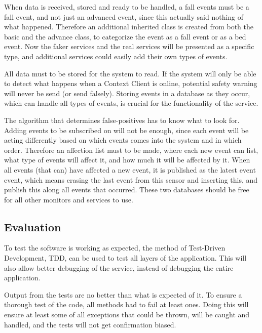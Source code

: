 When data is received, stored and ready to be handled, a fall events must be a fall event, and not just an advanced event, since this actually said nothing of what happened.
Therefore an additional inherited class is created from both the basic and the advance class, to categorize the event as a fall event or as a bed event.
Now the faker services and the real services will be presented as a specific type, and additional services could easily add their own types of events.

All data must to be stored for the system to read.
If the system will only be able to detect what happens when a Context Client\cite{JCAF} is online, potential safety warning will never be send (or send falsely).
Storing events in a database as they occur, which can handle all types of events, is crucial for the functionality of the service.

The algorithm that determines false-positives has to know what to look for.
Adding events to be subscribed on will not be enough, since each event will be acting differently based on which events comes into the system and in which order.
Therefore an affection list must to be made, where each new event can list, what type of events will affect it, and how much it will be affected by it.
When all events (that can) have affected a new event, it is published as the latest event event, which means erasing the last event from this sensor and inserting this, and publish this along all events that occurred.
These two databases should be free for all other monitors and services to use.

\vspace{-10pt}
\subsection{Evaluation}
\vspace{-15pt}

To test the software is working as expected, the method of Test-Driven Development, TDD, can be used to test all layers of the application.
This will also allow better debugging of the service, instead of debugging the entire application.

Output from the tests are no better than what is expected of it.
To ensure a thorough test of the code, all methods had to fail at least ones. 
Doing this will ensure at least some of all exceptions that could be thrown, will be caught and handled, and the tests will not get confirmation biased\cite{LessWrongBias}. 

